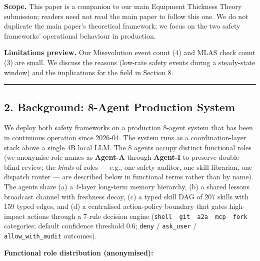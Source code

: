 \textbf{Scope.} This paper is a companion to our main Equipment
Thickness Theory submission; readers need not read the main paper to
follow this one. We do not duplicate the main paper's theoretical
framework; we focus on the two safety frameworks' operational behaviour
in production.

\textbf{Limitations preview.} Our Misevolution event count (4) and MLAS
check count (3) are small. We discuss the reasons (low-rate safety
events during a steady-state window) and the implications for the field
in Section 8.

\begin{center}\rule{0.5\linewidth}{0.5pt}\end{center}

\subsection{2. Background: 8-Agent Production
System}\label{background-8-agent-production-system}

We deploy both safety frameworks on a production 8-agent system that has
been in continuous operation since 2026-04. The system runs as a
coordination-layer stack above a single 4B local LLM. The 8 agents
occupy distinct functional roles (we anonymise role names as
\textbf{Agent-A} through \textbf{Agent-I} to preserve double-blind
review; the \emph{kinds} of roles --- e.g., one safety auditor, one
skill librarian, one dispatch router --- are described below in
functional terms rather than by name). The agents share (a) a 4-layer
long-term memory hierarchy, (b) a shared lessons broadcast channel with
freshness decay, (c) a typed skill DAG of 207 skills with 159 typed
edges, and (d) a centralised action-policy boundary that gates
high-impact actions through a 7-rule decision engine
(\texttt{shell\ \textbar{}\ git\ \textbar{}\ a2a\ \textbar{}\ mcp\ \textbar{}\ fork}
categories; default confidence threshold 0.6; \texttt{deny} /
\texttt{ask\_user} / \texttt{allow\_with\_audit} outcomes).

\textbf{Functional role distribution (anonymised):}

